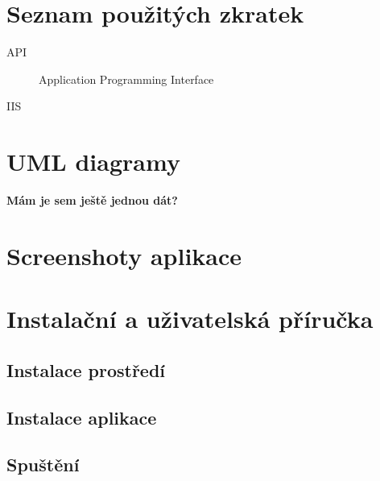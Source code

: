 \documentclass[11pt,twoside,a4paper]{book}
\begin{document}


%
{
\def\CS{$\cal C\kern-0.1667em\lower.5ex\hbox{$\cal S$}\kern-0.075em $}

}


\appendix

\chapter{Seznam použitých zkratek}

\begin{description}
\item[API] Application Programming Interface
\item[IIS] 

\end{description}


\chapter{UML diagramy}
\textbf{\large Mám je sem ještě jednou dát?}

\chapter{Screenshoty aplikace}


\chapter{Instalační a uživatelská příručka}
\section{Instalace prostředí}
\section{Instalace aplikace}
\section{Spuštění}
\end{document}
